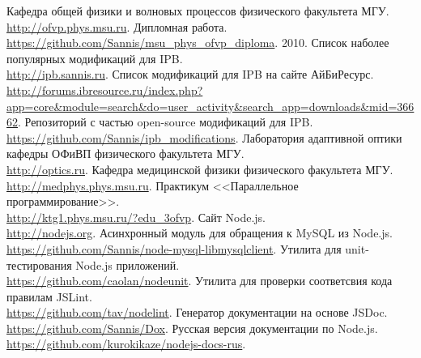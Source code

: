 \documentclass[11pt,a4paper]{moderncv}
\begin{document}
\renewcommand\refname{Ссылки}

\begin{thebibliography}{99}
    Кафедра общей физики и волновых процессов физического факультета МГУ.\\
    \url{http://ofvp.phys.msu.ru}.
    Дипломная работа.\\
    \url{https://github.com/Sannis/msu_phys_ofvp_diploma}.
    2010.
    Список наболее популярных модификаций для IPB.\\
    \url{http://ipb.sannis.ru}.
    Список модификаций для IPB на сайте АйБиРесурс.\\
    \url{http://forums.ibresource.ru/index.php?app=core&module=search&do=user_activity&search_app=downloads&mid=36662}.
    Репозиторий с частью open-source модификаций для IPB.\\
    \url{https://github.com/Sannis/ipb_modifications}.
    Лаборатория адаптивной оптики кафедры ОФиВП физического факультета МГУ.\\
    \url{http://optics.ru}.
    Кафедра медицинской физики физического факультета МГУ.\\
    \url{http://medphys.phys.msu.ru}.
    Практикум <<Параллельное программирование>>.\\
    \url{http://ktg1.phys.msu.ru/?edu_3ofvp}.
    Сайт Node.js.\\
    \url{http://nodejs.org}.
    Асинхронный модуль для обращения к MySQL из Node.js.\\
    \url{https://github.com/Sannis/node-mysql-libmysqlclient}.
    Утилита для unit-тестирования Node.js приложений.\\
    \url{https://github.com/caolan/nodeunit}.
    Утилита для проверки соответсвия кода правилам JSLint.\\
    \url{https://github.com/tav/nodelint}.
    Генератор документации на основе JSDoc.\\
    \url{https://github.com/Sannis/Dox}.
    Русская версия документации по Node.js.\\
    \url{https://github.com/kurokikaze/nodejs-docs-rus}.
\end{thebibliography}
\end{document}
